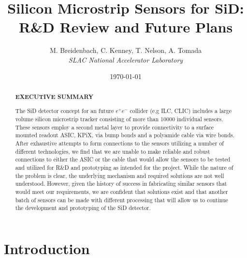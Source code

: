 \documentclass[prc,12pt,nofootinbib,letterpaper]{revtex4}
\begin{document}
\title{\bf{\Large Silicon Microstrip Sensors for SiD:} \\  R\&D Review and Future Plans}

\author{M. Breidenbach, C. Kenney, T. Nelson, A. Tomada \\ \textit{SLAC National Accelerator Laboratory}}

%

\date{\today}

\begin{abstract}
\vspace{0.5cm}

\begin{centerline}
{\bf {EXECUTIVE SUMMARY}}
\end{centerline}
\begin{singlespace}

The SiD detector concept for an future $e^+e^-$ collider (e.g ILC, CLIC) includes a large volume silicon microstrip tracker consisting of more than 10000 individual sensors.  These sensors employ a second metal layer to provide connectivity to a surface mounted readout ASIC, KPiX, via bump bonds and a polyamide cable via wire bonds.  After exhaustive attempts to form connections to the sensors utilizing a number of different technologies, we find that we are unable to make reliable and robust connections to either the ASIC or the cable that would allow the sensors to be tested and utilized for R\&D and prototyping as intended for the project. While the nature of the problem is clear, the underlying mechanism and required solutions are not well understood.  However, given the history of success in fabricating similar sensors that would meet our requirements, we are confident that solutions exist and that another batch of sensors can be made with different processing that will allow us to continue the development and prototyping of the SiD detector.

\end{singlespace}
\end{abstract}

\maketitle

\section{Introduction}
\end{document}
